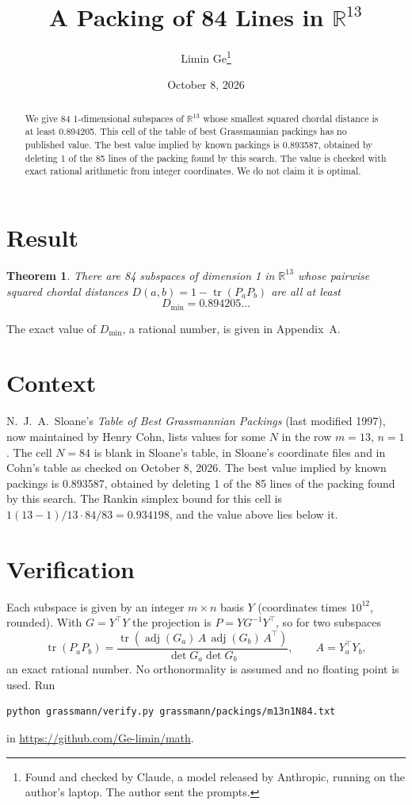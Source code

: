 \documentclass[11pt,a4paper]{article}
\title{A Packing of 84 Lines in $\mathbb{R}^{13}$}
\author{Limin Ge\thanks{Found and checked by Claude, a model released by Anthropic, running on the author's laptop. The author sent the prompts.}}
\date{October 8, 2026}
\newtheorem*{theorem}{Theorem}
\begin{document}
\maketitle
\begin{abstract}
We give 84 1-dimensional subspaces of $\mathbb{R}^{13}$ whose smallest squared chordal distance is at least 0.894205. This cell of the table of best Grassmannian packings has no published value. The best value implied by known packings is 0.893587, obtained by deleting 1 of the 85 lines of the packing found by this search. The value is checked with exact rational arithmetic from integer coordinates. We do not claim it is optimal.
\end{abstract}

\section{Result}
\begin{theorem}
There are 84 subspaces of dimension 1 in $\mathbb{R}^{13}$ whose pairwise squared chordal distances $D(a,b) = 1 - \operatorname{tr}(P_aP_b)$ are all at least
\[ D_{\min} = 0.894205\ldots \]
\end{theorem}
The exact value of $D_{\min}$, a rational number, is given in Appendix~A.


\section{Context}
N.~J.~A.~Sloane's \emph{Table of Best Grassmannian Packings} (last modified 1997), now maintained by Henry Cohn, lists values for some $N$ in the row $m=13$, $n=1$. The cell $N=84$ is blank in Sloane's table, in Sloane's coordinate files and in Cohn's table as checked on October 8, 2026. The best value implied by known packings is 0.893587, obtained by deleting 1 of the 85 lines of the packing found by this search. The Rankin simplex bound for this cell is $1(13-1)/13\cdot 84/83 = 0.934198$, and the value above lies below it.


\section{Verification}
Each subspace is given by an integer $m\times n$ basis $Y$ (coordinates times $10^{12}$, rounded). With $G=Y^\top Y$ the projection is $P=YG^{-1}Y^\top$, so for two subspaces
\[ \operatorname{tr}(P_aP_b)=\frac{\operatorname{tr}(\operatorname{adj}(G_a)\,A\,\operatorname{adj}(G_b)\,A^\top)}{\det G_a\det G_b},\qquad A=Y_a^\top Y_b, \]
an exact rational number. No orthonormality is assumed and no floating point is used. Run
\begin{verbatim}
python grassmann/verify.py grassmann/packings/m13n1N84.txt
\end{verbatim}
in \url{https://github.com/Ge-limin/math}.
\end{document}
